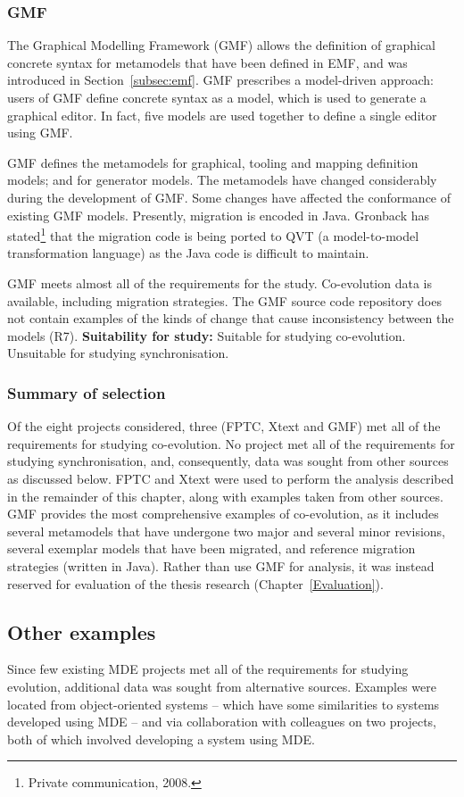 \subsubsection{GMF}
The Graphical Modelling Framework (GMF) \cite{gronback09emp} allows the definition of graphical concrete syntax for metamodels that have been defined in EMF, and was introduced in Section~\ref{subsec:emf}. GMF prescribes a model-driven approach: users of GMF define concrete syntax as a model, which is used to generate a graphical editor. In fact, five models are used together to define a single editor using GMF.

GMF defines the metamodels for graphical, tooling and mapping definition models; and for generator models. The metamodels have changed considerably during the development of GMF. Some changes have affected the conformance of existing GMF models. Presently, migration is encoded in Java. Gronback has stated\footnote{Private communication, 2008.} that the migration code is being ported to QVT (a model-to-model transformation language) as the Java code is difficult to maintain.

GMF meets almost all of the requirements for the study. Co-evolution data is available, including migration strategies. The GMF source code repository does not contain examples of the kinds of change that cause inconsistency between the models (R7). \textbf{Suitability for study:} Suitable for studying co-evolution. Unsuitable for studying synchronisation.

\subsubsection{Summary of selection}
Of the eight projects considered, three (FPTC, Xtext and GMF) met all of the requirements for studying co-evolution. No project met all of the requirements for studying synchronisation, and, consequently, data was sought from other sources as discussed below. FPTC and Xtext were used to perform the analysis described in the remainder of this chapter, along with examples taken from other sources. GMF provides the most comprehensive examples of co-evolution, as it includes several metamodels that have undergone two major and several minor revisions, several exemplar models that have been migrated, and reference migration strategies (written in Java). Rather than use GMF for analysis, it was instead reserved for evaluation of the thesis research (Chapter~\ref{Evaluation}).

\subsection{Other examples}
Since few existing MDE projects met all of the requirements for studying evolution, additional data was sought from alternative sources. Examples were located from object-oriented systems -- which have some similarities to systems developed using MDE -- and via collaboration with colleagues on two projects, both of which involved developing a system using MDE.

